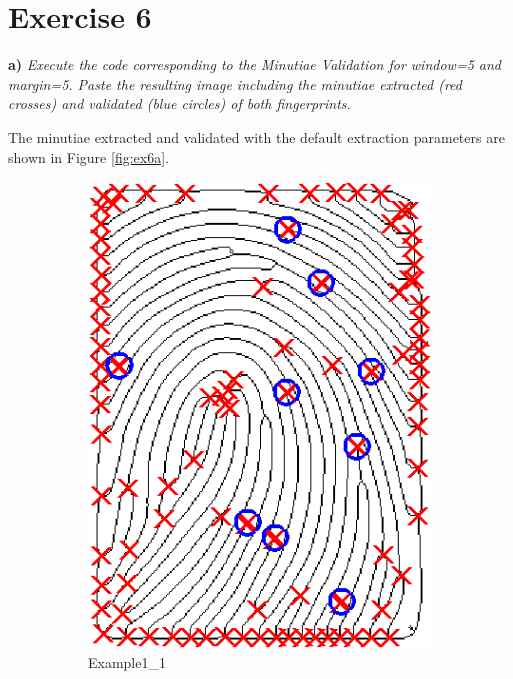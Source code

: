\documentclass[11pt]{article}
\begin{document}
\section*{Exercise 6}

\textbf{a) }\emph{Execute the code corresponding to the Minutiae Validation for window=5 and margin=5.  Paste the resulting image including the minutiae extracted (red crosses) and validated (blue circles) of both fingerprints.}

The minutiae extracted and validated with the default extraction parameters are shown in Figure \ref{fig:ex6a}.

\begin{figure}[h!]
  \centering
       \begin{subfigure}[t]{0.45\textwidth}
         \centering
         \includegraphics[scale=0.75]{img/ext_val_1}
         \caption{Example1\_1}
     \end{subfigure}%
     \quad
     \begin{subfigure}[t]{0.45\textwidth}
         \centering

\end{subfigure}
\end{figure}
\end{document}
